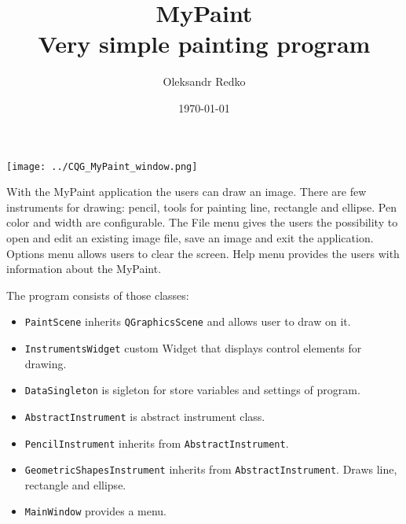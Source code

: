 \documentclass[a4paper, 14pt]{extreport}
\title{MyPaint\\
\vspace{2mm}
{\large Very simple painting program}}
\author{Oleksandr Redko}
\date{\today}
\begin{document}
	
	\maketitle
	\setcounter{page}{2}
	
	\noindent\texttt{[image: ../CQG\_MyPaint\_window.png]}
	
	With the \textsf{MyPaint} application the users can draw an image.
	There are few instruments for drawing: pencil, tools for painting line, rectangle and ellipse.
	Pen color and width are configurable.
	The \textsf{File} menu gives the users the possibility to open and edit an existing image file, save an image and exit the application.
	\textsf{Options} menu allows users to clear the screen.
	\textsf{Help} menu provides the users with information about the \textsf{MyPaint}.
	
	The program consists of those classes:
	\begin{itemize}
		\item \texttt{PaintScene} inherits \texttt{QGraphicsScene} and allows user to draw on it.
		\item \texttt{InstrumentsWidget} custom Widget that displays control elements for drawing.
		\item \texttt{DataSingleton} is sigleton for store variables and settings of program.
		\item \texttt{AbstractInstrument} is abstract instrument class.
		\item \texttt{PencilInstrument} inherits from \texttt{AbstractInstrument}. 
		\item \texttt{GeometricShapesInstrument} inherits from \texttt{AbstractInstrument}. Draws line, rectangle and ellipse.
		\item \texttt{MainWindow} provides a menu.\textbf{}
	\end{itemize}
	
\end{document}
